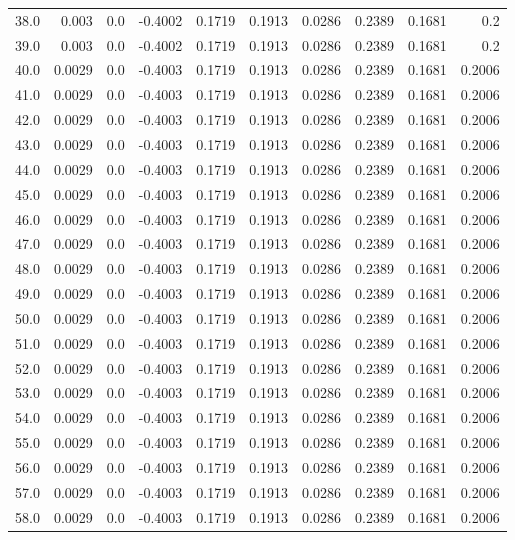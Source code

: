 \begin{longtable}{lrrrrrrrrr}
38.0 & 0.003 & 0.0 & -0.4002 & 0.1719 & 0.1913 & 0.0286 & 0.2389 & 0.1681 & 0.2 \\
39.0 & 0.003 & 0.0 & -0.4002 & 0.1719 & 0.1913 & 0.0286 & 0.2389 & 0.1681 & 0.2 \\
40.0 & 0.0029 & 0.0 & -0.4003 & 0.1719 & 0.1913 & 0.0286 & 0.2389 & 0.1681 & 0.2006 \\
41.0 & 0.0029 & 0.0 & -0.4003 & 0.1719 & 0.1913 & 0.0286 & 0.2389 & 0.1681 & 0.2006 \\
42.0 & 0.0029 & 0.0 & -0.4003 & 0.1719 & 0.1913 & 0.0286 & 0.2389 & 0.1681 & 0.2006 \\
43.0 & 0.0029 & 0.0 & -0.4003 & 0.1719 & 0.1913 & 0.0286 & 0.2389 & 0.1681 & 0.2006 \\
44.0 & 0.0029 & 0.0 & -0.4003 & 0.1719 & 0.1913 & 0.0286 & 0.2389 & 0.1681 & 0.2006 \\
45.0 & 0.0029 & 0.0 & -0.4003 & 0.1719 & 0.1913 & 0.0286 & 0.2389 & 0.1681 & 0.2006 \\
46.0 & 0.0029 & 0.0 & -0.4003 & 0.1719 & 0.1913 & 0.0286 & 0.2389 & 0.1681 & 0.2006 \\
47.0 & 0.0029 & 0.0 & -0.4003 & 0.1719 & 0.1913 & 0.0286 & 0.2389 & 0.1681 & 0.2006 \\
48.0 & 0.0029 & 0.0 & -0.4003 & 0.1719 & 0.1913 & 0.0286 & 0.2389 & 0.1681 & 0.2006 \\
49.0 & 0.0029 & 0.0 & -0.4003 & 0.1719 & 0.1913 & 0.0286 & 0.2389 & 0.1681 & 0.2006 \\
50.0 & 0.0029 & 0.0 & -0.4003 & 0.1719 & 0.1913 & 0.0286 & 0.2389 & 0.1681 & 0.2006 \\
51.0 & 0.0029 & 0.0 & -0.4003 & 0.1719 & 0.1913 & 0.0286 & 0.2389 & 0.1681 & 0.2006 \\
52.0 & 0.0029 & 0.0 & -0.4003 & 0.1719 & 0.1913 & 0.0286 & 0.2389 & 0.1681 & 0.2006 \\
53.0 & 0.0029 & 0.0 & -0.4003 & 0.1719 & 0.1913 & 0.0286 & 0.2389 & 0.1681 & 0.2006 \\
54.0 & 0.0029 & 0.0 & -0.4003 & 0.1719 & 0.1913 & 0.0286 & 0.2389 & 0.1681 & 0.2006 \\
55.0 & 0.0029 & 0.0 & -0.4003 & 0.1719 & 0.1913 & 0.0286 & 0.2389 & 0.1681 & 0.2006 \\
56.0 & 0.0029 & 0.0 & -0.4003 & 0.1719 & 0.1913 & 0.0286 & 0.2389 & 0.1681 & 0.2006 \\
57.0 & 0.0029 & 0.0 & -0.4003 & 0.1719 & 0.1913 & 0.0286 & 0.2389 & 0.1681 & 0.2006 \\
58.0 & 0.0029 & 0.0 & -0.4003 & 0.1719 & 0.1913 & 0.0286 & 0.2389 & 0.1681 & 0.2006 \\

\end{longtable}
